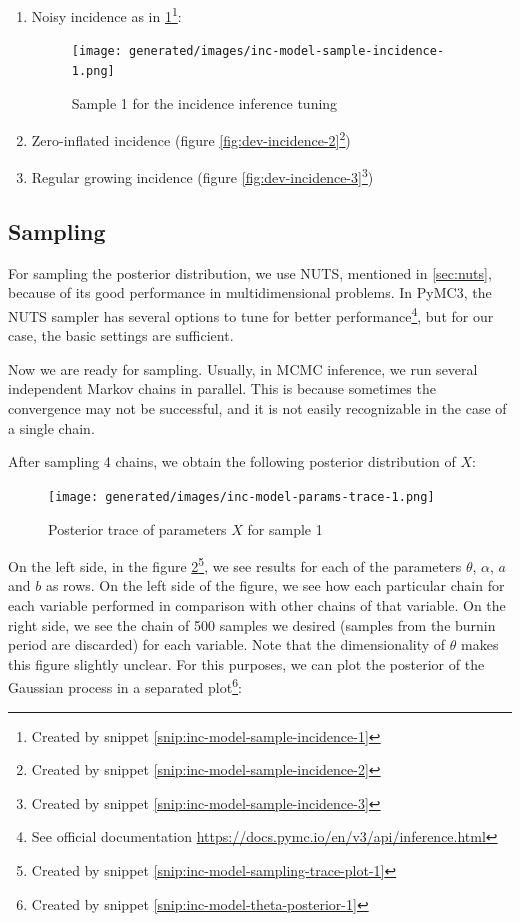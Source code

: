 \documentclass[
  digital, %
  oneside, %
  lof,     %
  lot,     %
]{fithesis4}
\begin{document}
\begin{enumerate}
  \item Noisy incidence as in \ref{fig:dev-incidence-1}\footnote{Created by snippet \ref{snip:inc-model-sample-incidence-1}}:
  \begin{figure}[H]
    \begin{center}
      \texttt{[image: generated/images/inc-model-sample-incidence-1.png]}
    \end{center}
    \caption{Sample 1 for the incidence inference tuning}
    \label{fig:dev-incidence-1}
  \end{figure}
  \item Zero-inflated incidence (figure \ref{fig:dev-incidence-2}\footnote{Created by snippet \ref{snip:inc-model-sample-incidence-2}})
  \item Regular growing incidence (figure \ref{fig:dev-incidence-3}\footnote{Created by snippet \ref{snip:inc-model-sample-incidence-3}})
\end{enumerate}


\subsection{Sampling}

For sampling the posterior distribution, we use NUTS, mentioned in \autoref{sec:nuts}, because of its good performance in multidimensional problems.
In PyMC3, the NUTS sampler has several options to tune for better performance\footnote{See official documentation \url{https://docs.pymc.io/en/v3/api/inference.html}}, but for our case, the basic settings are sufficient.

Now we are ready for sampling.
Usually, in MCMC inference, we run several independent Markov chains in parallel.
This is because sometimes the convergence may not be successful, and it is not easily recognizable in the case of a single chain.

After sampling 4 chains, we obtain the following posterior distribution of $X$:

\begin{figure}[H]
  \begin{center}
    \texttt{[image: generated/images/inc-model-params-trace-1.png]}
  \end{center}
  \caption{Posterior trace of parameters $X$ for sample 1}
  \label{fig:params-trace-1}
\end{figure}

On the left side, in the figure \ref{fig:params-trace-1}\footnote{Created by snippet \ref{snip:inc-model-sampling-trace-plot-1}}, we see results for each of the parameters $\theta$, $\alpha$, $a$ and $b$ as rows.
On the left side of the figure, we see how each particular chain for each variable performed in comparison with other chains of that variable.
On the right side, we see the chain of 500 samples we desired (samples from the burnin period are discarded) for each variable.
Note that the dimensionality of $\theta$ makes this figure slightly unclear.
For this purposes, we can plot the posterior of the Gaussian process in a separated plot\footnote{Created by snippet \ref{snip:inc-model-theta-posterior-1}}:
\end{document}
